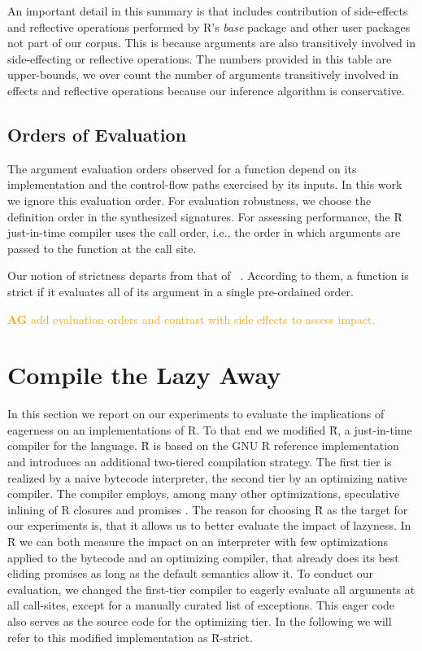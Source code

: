 \documentclass[review,nonacm,screen,acmsmall,anonymous=true]{acmart}
\newcommand{\authorcomment}[3]{\xspace\textcolor{#1}{{\bf #2} #3}\xspace}
\newcommand{\AG}[1]{\authorcomment{orange}{AG}{#1}}
\renewcommand{\Rsh}{{\sf\u R}\xspace}
\newcommand{\Rshstrict}{{\sf\u R-strict}\xspace}
\begin{document}
An important detail in this summary is that includes contribution of
side-effects and reflective operations performed by R's \emph{base} package and
other user packages not part of our corpus. This is because arguments are also
transitively involved in side-effecting or reflective operations. The numbers
provided in this table are upper-bounds, we over count the number of arguments
transitively involved in effects and reflective operations because our inference
algorithm is conservative.

\subsection{Orders of Evaluation}

The argument evaluation orders observed for a function depend on its
implementation and the control-flow paths exercised by its inputs. In this work
we ignore this evaluation order. For evaluation robustness, we choose the
definition order in the synthesized signatures. For assessing performance, the
\Rsh just-in-time compiler uses the call order, i.e., the order in which
arguments are passed to the function at the call site.

Our notion of strictness departs from that of ~\citet{oopsla19b}. According to
them, a function is strict if it evaluates all of its argument in a single
pre-ordained order.

\AG{add evaluation orders and contrast with side effects to assess impact.}


\section{Compile the Lazy Away}

In this section we report on our experiments to evaluate the implications of
eagerness on an implementations of R. To that end we modified \Rsh, a just-in-time
compiler for the language. \Rsh is based on the GNU R reference implementation
and introduces an additional two-tiered compilation strategy. The
first tier is realized by a naive bytecode interpreter, the second tier
by an optimizing native compiler. The compiler employs, among many other
optimizations, speculative inlining of R closures and promises \citep{dls19,
oopsla20c}.
The reason for choosing \Rsh as the target for our
experiments is, that it allows us to better evaluate the impact of lazyness. In
\Rsh we can both measure the impact on an interpreter with few optimizations
applied to the bytecode and an optimizing compiler, that already does its best
eliding promises as long as the default semantics allow it.
To conduct our evaluation, we changed the first-tier
compiler to eagerly evaluate all arguments at all call-sites, except for a
manually curated list of exceptions. This eager code also serves as the source
code for the optimizing tier. In the following we will refer
to this modified implementation as \Rshstrict.
\end{document}
